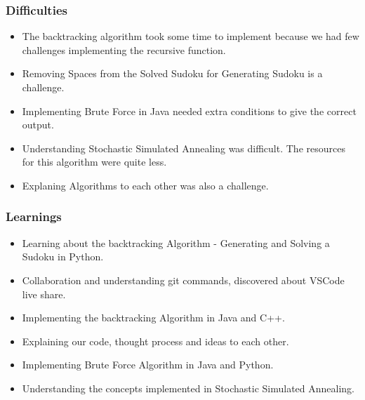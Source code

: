 \documentclass{beamer}
\begin{document}
\begin{frame}
     \frametitle{Difficulties}
     \begin{itemize}
          \item The backtracking algorithm took some time to implement because we had few challenges implementing the recursive function.
		  \item Removing Spaces from the Solved Sudoku for Generating Sudoku is a challenge. 
		  \item Implementing Brute Force in Java needed extra conditions to give the correct output.
		  \item Understanding Stochastic Simulated Annealing was difficult. The resources for this algorithm were quite less.
		  \item Explaning Algorithms to each other was also a challenge.
\end{itemize}
\end{frame}

\begin{frame}
     \frametitle{Learnings}
     \begin{itemize}
     \item Learning about the backtracking Algorithm -  Generating and Solving a Sudoku in Python.
     \item Collaboration and understanding git commands, discovered about VSCode live share.
	 \item Implementing the backtracking Algorithm in Java and C++.
	 \item Explaining our code, thought process and ideas to each other.
	 \item Implementing Brute Force Algorithm in Java and Python.
	 \item Understanding the concepts implemented in Stochastic Simulated Annealing.
\end{itemize}         
\end{frame}
\end{document}
